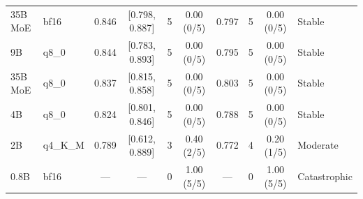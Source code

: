 \begin{table}[t]
{\begin{tabular}{llcccccccl}
35B MoE & bf16 & 0.846 & [0.798, 0.887] & 5 & 0.00 (0/5) & 0.797 & 5 & 0.00 (0/5) & Stable \\
9B & q8\_0 & 0.844 & [0.783, 0.893] & 5 & 0.00 (0/5) & 0.795 & 5 & 0.00 (0/5) & Stable \\
35B MoE & q8\_0 & 0.837 & [0.815, 0.858] & 5 & 0.00 (0/5) & 0.803 & 5 & 0.00 (0/5) & Stable \\
4B & q8\_0 & 0.824 & [0.801, 0.846] & 5 & 0.00 (0/5) & 0.788 & 5 & 0.00 (0/5) & Stable \\
\midrule
2B & q4\_K\_M & 0.789 & [0.612, 0.889] & 3 & 0.40 (2/5) & 0.772 & 4 & 0.20 (1/5) & Moderate \\
\midrule
0.8B & bf16 & --- & --- & 0 & 1.00 (5/5) & --- & 0 & 1.00 (5/5) & Catastrophic \\
\bottomrule
\end{tabular}}
\end{table}
